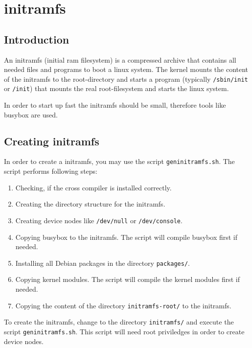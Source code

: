 \chapter{initramfs}

\section{Introduction}

An initramfs (initial ram filesystem) is a compressed archive that contains all
needed files and programs to boot a linux system. The kernel mounts the content
of the initramfs to the root-directory and starts a program (typically
\texttt{/sbin/init} or \texttt{/init}) that mounts the real root-filesystem and
starts the linux system. 

In order to start up fast the initramfs should be small, therefore tools like
busybox are used.

\section{Creating initramfs}

In order to create a initramfs, you may use the script \texttt{geninitramfs.sh}. The
script performs following steps:

\begin{enumerate}
\item Checking, if the cross compiler is installed correctly.
\item Creating the directory structure for the initramfs.
\item Creating device nodes like \texttt{/dev/null} or \texttt{/dev/console}.
\item Copying busybox to the initramfs. The script will compile busybox first if needed.
\item Installing all Debian packages in the directory \texttt{packages/}.
\item Copying kernel modules. The script will compile the kernel modules first if needed.
\item Copying the content of the directory \texttt{initramfs-root/} to the initramfs.
\end{enumerate}

To create the initramfs, change to the directory \texttt{initramfs/} and
execute the script \texttt{geninitramfs.sh}. This script will need root
priviledges in order to create device nodes.

